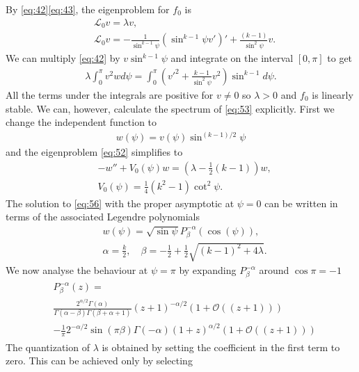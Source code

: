 By \eqref{eq:42}\eqref{eq:43}, the eigenproblem for $f_0$ is
\begin{align}
  \label{eq:52}
  &\mathcal{L}_0 v = \lambda v, \\
  \label{eq:53}
  &\mathcal{L}_0 v = -\frac{1}{\sin^{k-1}\psi}\left(\sin^{k-1}\psi
      v'\right)'+\frac{(k-1)}{\sin^2\psi}v.
\end{align}
We can multiply \eqref{eq:42} by $v\sin^{k-1}\psi$ and integrate on
the interval $[0,\pi]$ to get
\begin{align}\label{eq:54}
  \lambda\int_0^\pi v^2w
  d\psi=\int_0^\pi\left(v'^2+\frac{k-1}{\sin^2\psi}v^2\right)\sin^{k-1}d\psi.
\end{align}
All the terms under the integrals are positive for $v\ne0$ so
$\lambda>0$ and $f_0$ is linearly stable. We can, however, calculate
the spectrum of \eqref{eq:53} explicitly. First we change the
independent function to
\begin{align}
  \label{eq:55}
  w(\psi)= v(\psi)\sin^{(k-1)/2}\psi
\end{align}
and the eigenproblem \eqref{eq:52} simplifies to
\begin{align}
  \label{eq:56}
  &-w''+V_0(\psi)w=\left(\lambda-\frac{1}{2}(k-1)\right)w,\\
  &V_0(\psi)=\frac{1}{4}(k^2-1)\cot^2\psi.
\end{align}
The solution to \eqref{eq:56} with the proper asymptotic at $\psi=0$
can be written in terms of the associated Legendre polynomials
\begin{align}
  \label{eq:57}
  &w(\psi)=\sqrt{\sin\psi}P^{-\alpha}_{\beta}(\cos(\psi)),\\
  \label{eq:58}
  &\alpha=\frac{k}{2},\quad \beta=-\frac{1}{2}+\frac{1}{2}\sqrt{(k-1)^2+4\lambda}.
\end{align}
We now analyse the behaviour at $\psi=\pi$ by expanding
$P_\beta^{-\alpha}$ around $\cos\pi=-1$
\begin{align}
  \label{eq:59}
  \begin{split}
    &P_\beta^{-\alpha}(z)=\\
    &\frac{2^{\alpha/2}\Gamma(\alpha)}{\Gamma(\alpha-\beta)\Gamma(\beta+\alpha+1)}
    (z+1)^{-\alpha/2}(1+\mathcal{O}((z+1)))\\
    &-\frac{1}{\pi}2^{-\alpha/2}\sin(\pi\beta)\Gamma(-\alpha)
    (1+z)^{\alpha/2}(1+\mathcal{O}((z+1)))
  \end{split}
\end{align}
The quantization of $\lambda$ is obtained by setting the coefficient
in the first term to zero. This can be achieved only by selecting
